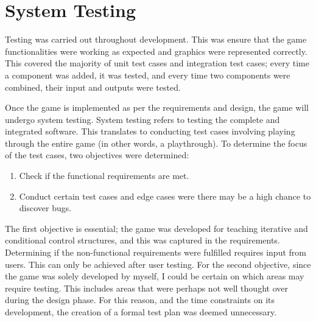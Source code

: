 \documentclass[a4paper,11.5pt]{report}
\numberwithin{figure}{section}
\numberwithin{table}{section}
\numberwithin{equation}{section}
\numberwithin{equation}{section}
\begin{document}


\section{System Testing}

Testing was carried out throughout development. This was ensure that the game functionalities were working as expected and graphics were represented correctly. This covered the majority of unit test cases and integration test cases; every time a component was added, it was tested, and every time two components were combined, their input and outputs were tested.

Once the game is implemented as per the requirements and design, the game will undergo system testing. System testing refers to testing the complete and integrated software. This translates to conducting test cases involving playing through the entire game (in other words, a playthrough). To determine the focus of the test cases, two objectives were determined:

\begin{enumerate}
	\item Check if the functional requirements are met.
	\item Conduct certain test cases and edge cases were there may be a high chance to discover bugs.
\end{enumerate}

The first objective is essential; the game was developed for teaching iterative and conditional control structures, and this was captured in the requirements. Determining if the non-functional requirements were fulfilled requires input from users. This can only be achieved after user testing. For the second objective, since the game was solely developed by myself, I could be certain on which areas may require testing. This includes areas that were perhaps not well thought over during the design phase. For this reason, and the time constraints on its development, the creation of a formal test plan was deemed unnecessary.
\end{document}
